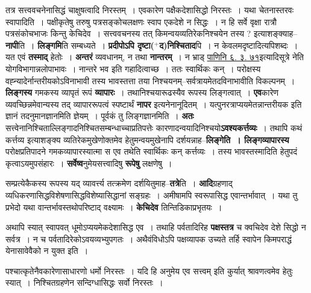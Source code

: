 \documentclass[article,12pt,a4paper]{memoir}
\newcommand{\add}[1]{($^{+}$#1)}
\begin{document}
	तत्र सत्त्ववचनेनासिद्धं चाक्षुषत्वादि निरस्तम् । एवकारेण पक्षैकदेशासिद्धो निरस्तः । यथा चेतनास्तरवः स्वापादिति । पक्षीकृतेषु तरुषु पत्रसङ्कोचलक्षणः स्वाप एकदेशे न सिद्धः । न हि सर्वे वृक्षा रात्रौ पत्रसंकोचभाजः किन्तु केचिदेव । सत्त्ववचनस्य तत् किमन्वयव्यतिरेकनिश्चयेन तस्य ? इत्याशङ्क्याह--\textbf{नापी}ति । \textbf{लिङ्गमि}ति सम्बध्यते । \textbf{प्रदीपोऽपि दृष्टा\add{द}निश्चिताद}पि । न केवलमदृष्टादित्यपिशब्दः । यत एवं \textbf{तस्माद्} हेतोः । \textbf{अन्तरं} व्यवधानम्, न तथा \textbf{नान्तरम्} । न भ्राड् \href{http://sarit.indology.info/?cref=Pā.6.3.75}{पाणिनि ६. ३. ७१}इत्यादिसूत्रे नेति योगविभागान्नलोपाभावः । नान्तरे भव इति गहादित्वाच्छ । ततः स्वार्थिकः कन् । परोक्षस्य वह्न्यादेर्नान्तरीयकोऽविनाभावी तस्य भावस्तत्ता तया निश्चयनम्--सर्वत्रायमेतदविनाभावीति विकल्पनम् । \textbf{लिङ्गस्य} गमकस्य व्यापृतं रूपं \textbf{व्यापारः} । तथानिश्चयारूढस्यैव रूपस्य लिङ्गत्वात् । \textbf{एव}कारेण व्यवच्छिन्नमेवान्यस्य तद् व्यापाररूपत्वं स्पष्टार्थं \textbf{नापर} इत्यनेनानूदितम् । यत्पुनरत्राप्ययमेतन्नान्तरीयक इति ज्ञानं तदनुमानज्ञानमिति ज्ञेयम् । पूर्वकं तु लिङ्गज्ञानमिति । \textbf{अतः} सत्त्वेनानिश्चिताल्लिङ्गादनिश्चितसम्बन्धाच्चाप्रतिपत्तेः कारणादन्वयादिनिश्चयो\textbf{ऽवश्यकर्त्तव्यः} । तथापि कथं कर्त्तव्य इत्याशङ्क्य व्यतिरेकमुखेणोक्तमेव हेतुमन्वयमुखेनापि दर्शयन्नाह--\textbf{लिङ्गेति । लिङ्गव्यापारस्य} परोक्षप्रतिपादने गमकव्यापारस्यात्मा स एव तथेति स्वार्थिकः कन् कर्त्तव्यः । तस्य भावस्तस्मादिति हेतुपदं कृत्वाऽयमुपसंहारः । \textbf{सर्वेष्व}नुमेयसत्त्वादिषु \textbf{रूपेषु} लक्षणेषु । \leavevmode{}
	\pend
      

	  \pstart सम्प्रत्येकैकस्य रूपस्य यद् व्यावर्त्त्य तत्क्रमेण दर्शयितुमाह--\textbf{तत्रे}ति । \textbf{आदि}ग्रहणाद् व्यधिकरणासिद्धविशेषणासिद्धविशेष्यासिद्धानां सङ्ग्रहः । अमीषामपि स्वरूपासिद्ध एवान्तर्भावात् । यथा तु प्रभेदो यथा वान्तर्भावस्तथोपरिष्टाद् वक्ष्यामः । \textbf{केचिदेव} तिन्तिडिकाप्रभृतयः ।
	\pend
      

	  \pstart अथापि स्यात् स्वापवत् धूमोऽप्ययमेकदेशासिद्ध एव । तथाहि पर्वतादिरिह \textbf{पक्षस्तत्र} च क्वचिदेव देशे सिद्धो न सर्वत्र । न च पर्वतादिरेकोऽवयव्यभ्युपगतः । अथैवंविधोऽपि पक्षव्यापक उच्यते तर्हि स्वापेन किमपराद्धं येनासावेवैको न युक्त इति ।
	\pend
	  \bigskip
	  \begingroup
	

	  \pstart पश्चात्कृतेनैवकारेणासाधारणो धर्मो निरस्तः । यदि हि अनुमेय एव सत्त्वम् इति कुर्यात् श्रावणत्वमेव हेतुः स्यात् । निश्चितग्रहणेन सन्दिग्धासिद्धः सर्वो निरस्तः ।
	\pend
        
\end{document}
